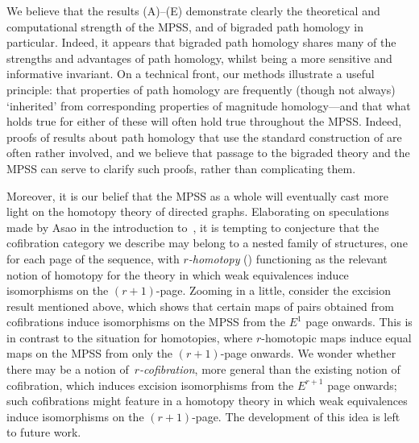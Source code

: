 \documentclass[a4paper, 11 pt, oneside, reqno]{amsart}
\numberwithin{lemma}{section}
\theoremstyle{definition}
\begin{document}
We believe that the results (A)--(E) demonstrate clearly the theoretical and computational strength of the MPSS, and of bigraded path homology in particular. Indeed, it appears that bigraded path homology shares many of the strengths and advantages of path homology, whilst being a more sensitive and informative invariant. On a technical front, our methods illustrate a useful principle: that properties of path homology are frequently (though not always) `inherited' from corresponding properties of magnitude homology---and that what holds true for either of these will often hold true throughout the MPSS. Indeed, proofs of results about path homology that use the standard construction  of \cite{GLMY2013,PH-homotopy}  are often rather involved, and we believe that passage to the bigraded theory and the MPSS can serve to clarify such proofs, rather than complicating them.

Moreover, it is our belief that the MPSS as a whole will eventually cast more light on the homotopy theory of directed graphs. Elaborating on speculations made by Asao in the introduction to~\cite{Asao-filtered}, it is tempting to conjecture that the cofibration category we describe may belong to a nested family of structures, one for each page of the sequence, with \emph{$r$-homotopy} () functioning as the relevant notion of homotopy for the theory in which weak equivalences induce isomorphisms on the $(r+1)$-page. Zooming in a little, consider the excision result mentioned above, which shows that  certain maps of pairs obtained from cofibrations induce isomorphisms on the MPSS from the $E^1$ page onwards. This is in contrast to the situation for homotopies, where $r$-homotopic maps induce equal maps on the MPSS from only the $(r+1)$-page onwards. We wonder whether there may be a notion of~\emph{$r$-cofibration}, more general than the existing notion of cofibration, which induces excision isomorphisms from the $E^{r+1}$ page onwards; such cofibrations might feature in a homotopy theory in which weak equivalences induce isomorphisms  on the $(r+1)$-page. The development of this idea is left to future work.
\end{document}
